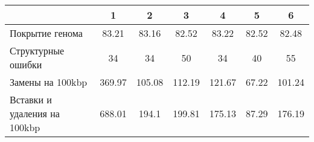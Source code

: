 \begin{adjustbox}{center}
\begin{tabular}{|l||c|c|c|c|c|c|}
\hline
& 1 & 2 & 3 & 4 & 5 & 6 \\
\hline
\hline
Покрытие генома & \cellcolor[RGB]{227, 227, 252} 83.21 & \cellcolor[RGB]{232, 232, 252} 83.16 & \cellcolor[RGB]{252, 232, 232} 82.52 & \cellcolor[RGB]{227, 227, 252} 83.22 & \cellcolor[RGB]{252, 232, 232} 82.52 & \cellcolor[RGB]{252, 227, 227} 82.48 \\
\hline
Структурные ошибки & \cellcolor[RGB]{232, 232, 252} 34 & \cellcolor[RGB]{232, 232, 252} 34 & \cellcolor[RGB]{235, 71, 71} 50 & \cellcolor[RGB]{232, 232, 252} 34 & \cellcolor[RGB]{252, 232, 232} 40 & \cellcolor[RGB]{235, 71, 71} 55 \\
\hline
Замены на 100kbp & \cellcolor[RGB]{235, 71, 71} 369.97 & \cellcolor[RGB]{241, 241, 253} 105.08 & \cellcolor[RGB]{253, 237, 237} 112.19 & \cellcolor[RGB]{248, 195, 195} 121.67 & \cellcolor[RGB]{48, 48, 232} 67.22 & \cellcolor[RGB]{227, 227, 252} 101.24 \\
\hline
Вставки и удаления на 100kbp & \cellcolor[RGB]{235, 71, 71} 688.01 & \cellcolor[RGB]{252, 232, 232} 194.1 & \cellcolor[RGB]{251, 218, 218} 199.81 & \cellcolor[RGB]{232, 232, 252} 175.13 & \cellcolor[RGB]{48, 48, 232} 87.29 & \cellcolor[RGB]{232, 232, 252} 176.19 \\
\hline
\end{tabular}
\end{adjustbox}
